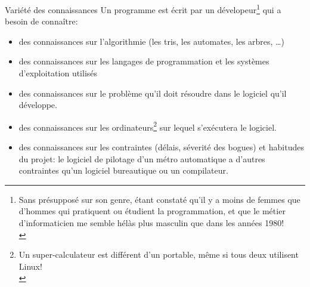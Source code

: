 \documentclass[final,a4,xcolor={svgnames,dvipsnames}]{beamer}
\begin{document}
 \begin{frame}{Variété des connaissances}
   Un programme est écrit par un dévelopeur\footnote{Sans présupposé
   sur son genre, étant constaté qu'il y a moins de femmes que
   d'hommes qui pratiquent ou étudient la programmation, et que le
   métier d'informaticien me semble hélàs plus masculin que dans les années
   1980!\\} qui a besoin de connaître:
   \begin{relsize}{-0.5}
   \begin{itemize}
   \item des connaissances sur l'algorithmie (les tris, les automates, les arbres, \ldots)
   \item des connaissances sur les langages de programmation et les systèmes d'exploitation utilisés
   \item des connaissances sur le problème qu'il doit résoudre dans le logiciel qu'il développe.
   \item des connaissances sur les ordinateurs\footnote{Un
   super-calculateur est différent d'un portable, même si tous deux
   utilisent Linux!\medskip\\} sur lequel s'exécutera le logiciel.
   \item des connaissances sur les contraintes (délais, séverité des
     bogues) et habitudes du projet: le logiciel de pilotage d'un
     métro automatique a d'autres contraintes qu'un logiciel
     bureautique ou un compilateur.
   \end{itemize}
   \end{relsize}
 \end{frame}
\end{document}
